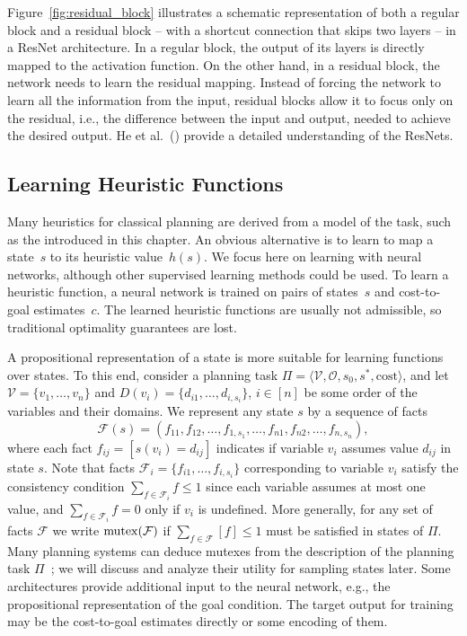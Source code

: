 Figure~\ref{fig:residual_block} illustrates a schematic representation of both a regular block and a residual block -- with a shortcut connection that skips two layers -- in a ResNet architecture. In a regular block, the output of its layers is directly mapped to the activation function. On the other hand, in a residual block, the network needs to learn the residual mapping. Instead of forcing the network to learn all the information from the input, residual blocks allow it to focus only on the residual, i.e., the difference between the input and output, needed to achieve the desired output. He et al.~(\citeyear{He.etal/2016}) provide a detailed understanding of the ResNets.

\subsection{Learning Heuristic Functions}
\label{sec:background_learningheuristics}

Many heuristics for classical planning are derived from a model of the task, such as the \sas introduced in this chapter. An obvious alternative is to learn to map a state~$s$ to its heuristic value~$h(s)$. We focus here on learning with neural networks, although other supervised learning methods could be used. To learn a heuristic function, a neural network is trained on pairs of states~$s$ and cost-to-goal estimates~$c$. The learned heuristic functions are usually not admissible, so traditional optimality guarantees are lost.

A propositional representation of a state is more suitable for learning functions over states. To this end, consider a planning task $\Pi=\langle\mathcal{V},\mathcal{O},s_0,s^*, \text{cost}\rangle$, and let $\mathcal{V}=\{v_1,\ldots,v_n\}$ and $D(v_i)=\{d_{i1},\ldots,d_{i,s_i}\}$, $i\in[n]$ be some order of the variables and their domains. We represent any state $s$ by a sequence of facts $$\mathcal{F}(s)=(f_{11},f_{12},\ldots,f_{1,s_1},\ldots,f_{n1},f_{n2},\ldots,f_{n,s_n}),$$ where each fact $f_{ij}=[s(v_i)=d_{ij}]$ indicates if variable $v_i$ assumes value $d_{ij}$ in state $s$. Note that facts $\mathcal{F}_i=\{f_{i1},\ldots,f_{i,s_i}\}$ corresponding to variable $v_i$ satisfy the consistency condition $\sum_{f\in \mathcal{F}_i} f\leq 1$ since each variable assumes at most one value, and $\sum_{f\in \mathcal{F}_i} f=0$ only if $v_i$ is undefined. More generally, for any set of facts $\mathcal{F}$ we write $\operatorname{mutex}(\mathcal{F})$ if $\sum_{f\in \mathcal{F}} [f]\leq 1$ must be satisfied in states of $\Pi$. Many planning systems can deduce mutexes from the description of the planning task $\Pi$~\cite{Helmert/2009}; we will discuss and analyze their utility for sampling states later. Some architectures provide additional input to the neural network, e.g., the propositional representation of the goal condition. The target output for training may be the cost-to-goal estimates directly or some encoding of them.


